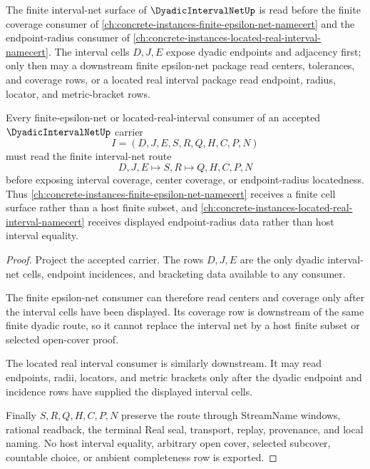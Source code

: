 The finite interval-net surface of $\DyadicIntervalNetUp$ is read before the finite coverage consumer of \autoref{ch:concrete-instances-finite-epsilon-net-namecert} and the endpoint-radius consumer of \autoref{ch:concrete-instances-located-real-interval-namecert}. The interval cells $D,J,E$ expose dyadic endpoints and adjacency first; only then may a downstream finite epsilon-net package read centers, tolerances, and coverage rows, or a located real interval package read endpoint, radius, locator, and metric-bracket rows.

\begin{theorem}
\label{thm:dyadic-interval-net-finite-epsilon-located-interval-dependency}
Every finite-epsilon-net or located-real-interval consumer of an accepted $\DyadicIntervalNetUp$ carrier
$$
I=(D,J,E,S,R,Q,H,C,P,N)
$$
must read the finite interval-net route
$$
D,J,E \longmapsto S,R \longmapsto Q,H,C,P,N
$$
before exposing interval coverage, center coverage, or endpoint-radius locatedness. Thus \autoref{ch:concrete-instances-finite-epsilon-net-namecert} receives a finite cell surface rather than a host finite subset, and \autoref{ch:concrete-instances-located-real-interval-namecert} receives displayed endpoint-radius data rather than host interval equality.
\end{theorem}
\begin{proof}
Project the accepted carrier. The rows $D,J,E$ are the only dyadic interval-net cells, endpoint incidences, and bracketing data available to any consumer.

The finite epsilon-net consumer can therefore read centers and coverage only after the interval cells have been displayed. Its coverage row is downstream of the same finite dyadic route, so it cannot replace the interval net by a host finite subset or selected open-cover proof.

The located real interval consumer is similarly downstream. It may read endpoints, radii, locators, and metric brackets only after the dyadic endpoint and incidence rows have supplied the displayed interval cells.

Finally $S,R,Q,H,C,P,N$ preserve the route through StreamName windows, rational readback, the terminal Real seal, transport, replay, provenance, and local naming. No host interval equality, arbitrary open cover, selected subcover, countable choice, or ambient completeness row is exported.
\end{proof}
